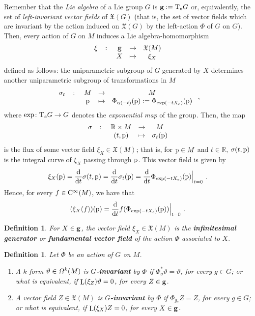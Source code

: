\documentclass[12pt]{report}
\newtheorem{definition}[teor]{Definition}
\def\vf{\mathfrak X}
\def\df{{\mit\Omega}}
\def\d{{\rm d}}
\def\Real{\mathbb{R}}
\def\Tan{{\rm T}}
\def\Lie{\mathop{\rm L}\nolimits}
\def\Cinfty{{\rm C}^\infty}
\begin{document}
Remember that the {\sl Lie algebra} of  a Lie group $G$ is
${\bf g}:=\Tan_eG$ or, equivalently, the set of
{\sl left-invariant vector fields} of $\vf(G)$
(that is, the set of vector fields which are invariant
by the action induced on $\vf(G)$ by the left-action $\Phi$ of $G$ on $G$). 
Then, every action of $G$ on $M$ induces a Lie algebra-homomorphism 
$$
\begin{array}{ccccc}
\xi&\colon&{\bf g}&\to&\vf(M)
\\
& &X&\mapsto&\xi_X
\end{array}
$$
defined as follows: the uniparametric subgroup of $G$
generated by $X$ determines another 
uniparametric subgroup of transformations in $M$
$$
\begin{array}{ccccc}
\sigma_t&\colon&M&\to&M
\\
& & {\rm p}&\mapsto&\Phi_{\alpha(-t)}({\rm p}) := \Phi_{{\rm exp}(-tX_e)}({\rm p})
\end{array} \ ,
$$
where ${\rm exp}\colon\Tan_eG\to G$ denotes the 
{\sl exponential map} of the group. Then, the map
$$
\begin{array}{ccccc}
\sigma&\colon&\Real \times M&\to&M
\\
& &(t,{\rm p})&\mapsto&\sigma_t({\rm p}) 
\end{array}
$$
is the flux of some vector field $\xi_X \in\vf(M)$;
that is, for ${\rm p}\in M$ and $t \in \Real$,
$\sigma (t,{\rm p})$ is the integral curve of $\xi_X$
passing through ${\rm p}$. This vector field is given by
$$
\xi_X({\rm p}) = \frac{\d }{\d t}\sigma (t,{\rm p}) = 
\frac{\d }{\d t}\sigma_t({\rm p}) = 
\frac{\d }{\d t}\Phi_{{\rm exp}(-tX_e)}({\rm p})\Big\vert_{t=0} \ .
$$
Hence, for every $f \in\Cinfty(M)$, we have that
$$
(\xi_X(f))({\rm p}) = \frac{\d }{\d t}f(\Phi_{{\rm exp}(-tX_e)}({\rm p}))\Big\vert_{t=0}\ .
$$

\begin{definition}
For $X \in {\bf g}$,  the vector field $\xi_X\in\vf(M)$ is the
\textbf{infinitesimal generator} or \textbf{fundamental vector field}
of the action $\Phi$ associated to $X$.
\end{definition}

\begin{definition}
Let $\Phi$ be an action of $G$ on $M$.
\begin{enumerate}
\item
A $k$-form $\vartheta \in\df^k(M)$ is \textbf{$G$-invariant} by $\Phi$ 
if $\Phi_g^*\vartheta =\vartheta$, for every $g \in G$;
or what is equivalent, if
$\Lie(\xi_Z)\vartheta = 0$, for every $Z \in {\bf g}$.
\item
A vector field $Z\in\vf(M)$ is \textbf{$G$-invariant} by $\Phi$ 
if $\Phi_{g_*}Z =Z$, for every $g \in G$;
or what is equivalent, if
$\Lie(\xi_X)Z= 0$, for every $X\in{\bf g}$.
\end{enumerate}
\end{definition}
\end{document}
